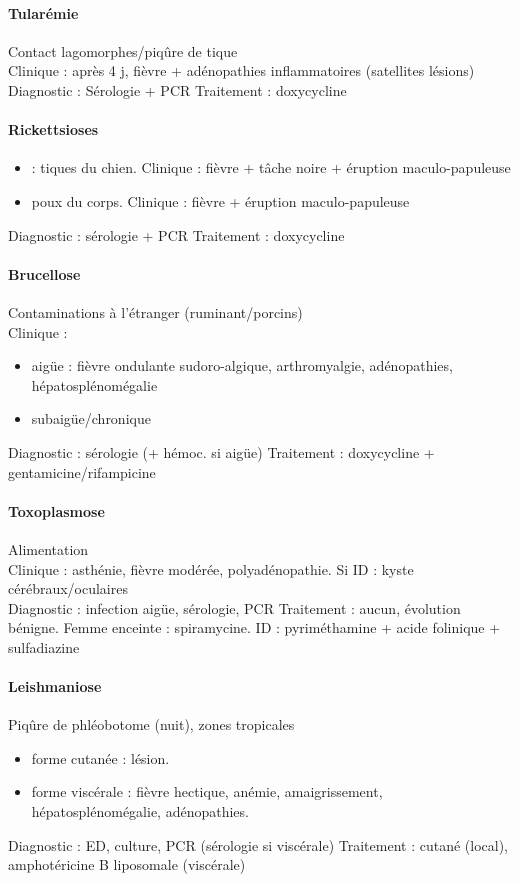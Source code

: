 \documentclass{article}
\begin{document}
\paragraph{Tularémie} Contact lagomorphes/piqûre de tique\\
Clinique : après 4 j, fièvre + adénopathies inflammatoires (satellites lésions)
Diagnostic : Sérologie + PCR
Traitement : doxycycline


\paragraph{Rickettsioses} 
\begin{itemize}
  \item {} : tiques du chien. Clinique : fièvre + tâche noire +
    éruption maculo-papuleuse
  \item {} poux du corps. Clinique : fièvre + éruption
    maculo-papuleuse
\end{itemize}
Diagnostic : sérologie + PCR
Traitement : doxycycline

\paragraph{Brucellose} Contaminations à l'étranger (ruminant/porcins)\\
Clinique :
\begin{itemize}
  \item aigüe : fièvre ondulante sudoro-algique, arthromyalgie, adénopathies,
    hépatosplénomégalie
  \item subaigüe/chronique
\end{itemize}
Diagnostic : sérologie (+ hémoc. si aigüe)
Traitement : doxycycline + gentamicine/rifampicine

\paragraph{Toxoplasmose} Alimentation\\
Clinique : asthénie, fièvre modérée, polyadénopathie. Si ID : kyste
cérébraux/oculaires\\
Diagnostic : infection aigüe, sérologie, PCR
Traitement : aucun, évolution bénigne. Femme enceinte : spiramycine. ID :
pyriméthamine + acide folinique + sulfadiazine

\paragraph{Leishmaniose} Piqûre de phléobotome (nuit), zones tropicales\\
\begin{itemize}
  \item forme cutanée : lésion. 
  \item forme viscérale : fièvre hectique, anémie, amaigrissement,
    hépatosplénomégalie, adénopathies.
\end{itemize}
Diagnostic : ED, culture, PCR (sérologie si viscérale)
Traitement : cutané (local), amphotéricine B liposomale (viscérale)
\end{document}
